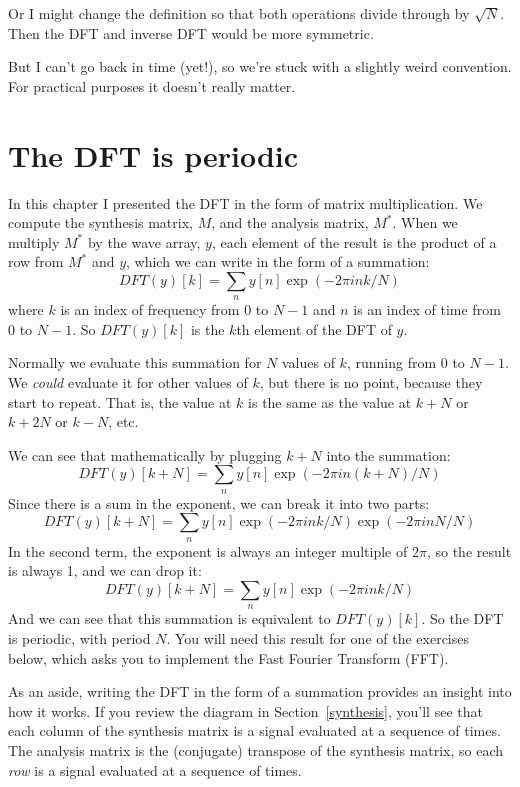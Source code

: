 \documentclass[12pt]{book}
\begin{document}
Or I might change the definition so that both operations divide
through by $\sqrt{N}$.  Then the DFT and inverse DFT would be
more symmetric.

But I can't go back in time (yet!), so we're stuck with a slightly
weird convention.  For practical purposes it doesn't really
matter.


\section{The DFT is periodic}

In this chapter I presented the DFT in the form of matrix multiplication.
We compute the synthesis matrix, $M$, and the analysis matrix, $M^*$.
When we multiply $M^{*}$ by the wave array, $y$, each element of the
result is the product of a row from $M^*$ and $y$, which we can
write in the form of a summation:
%
\[ DFT(y)[k] = \sum_n y[n] \exp(-2 \pi i n k / N) \]
%
where $k$ is an index of frequency from
$0$ to $N-1$ and $n$ is an index of time from $0$ to $N-1$.
So $DFT(y)[k]$ is the $k$th element of the DFT of $y$.

Normally we evaluate this summation for $N$ values of $k$, running from
0 to $N-1$.  We {\em could} evaluate it for other values of $k$, but
there is no point, because they start to repeat.  That is, the value at
$k$ is the same as the value at $k+N$ or $k+2N$ or $k-N$, etc.

We can see that mathematically by plugging $k+N$ into the summation:
%
\[ DFT(y)[k+N] = \sum_n y[n] \exp(-2 \pi i n (k+N) / N) \]
%
Since there is a sum in the exponent, we can break it into two parts:
%
\[ DFT(y)[k+N] = \sum_n y[n] \exp(-2 \pi i n k / N)  \exp(-2 \pi i n N / N) \]
%
In the second term, the exponent is always an integer multiple of
$2 \pi$, so the result is always 1, and we can drop it:
%
\[ DFT(y)[k+N] = \sum_n y[n] \exp(-2 \pi i n k / N) \]
%
And we can see that this summation is equivalent to $ DFT(y)[k]$.
So the DFT is periodic, with period $N$.  You will need this result
for one of the exercises below, which asks you to implement the Fast Fourier
Transform (FFT).

As an aside, writing the DFT in the form of a summation provides an
insight into how it works.  If you review the diagram in
Section~\ref{synthesis}, you'll see that each column of the synthesis matrix
is a signal evaluated at a sequence of times.  The analysis matrix is
the (conjugate) transpose of the synthesis matrix, so each {\em row}
is a signal evaluated at a sequence of times.
\end{document}

